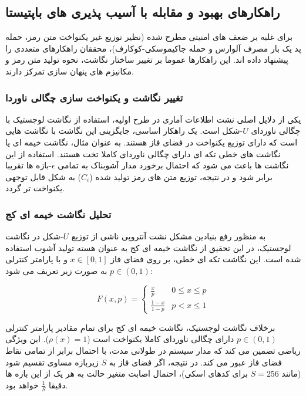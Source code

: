 \documentclass[12pt]{report}
\begin{document}
\subsection{راهکارهای بهبود و مقابله با آسیب پذیری های باپتیستا}
برای غلبه بر ضعف های امنیتی مطرح شده (نظیر توزیع غیر یکنواخت متن رمز، حمله پد یک بار مصرف 
آلوارس و حمله جاکیموسکی-کوکارف)، محققان راهکارهای متعددی را پیشنهاد داده اند. این راهکارها 
عموما بر تغییر ساختار نگاشت، نحوه تولید متن رمز و مکانیزم های پنهان سازی تمرکز دارند.

\subsubsection{تغییر نگاشت و یکنواخت سازی چگالی ناوردا}
یکی از دلایل اصلی نشت اطلاعات آماری در طرح اولیه، استفاده از نگاشت لوجستیک با چگالی ناوردای 
$U$-شکل است. یک راهکار اساسی، جایگزینی این نگاشت با نگاشت هایی است که دارای توزیع یکنواخت 
در فضای فاز هستند. به عنوان مثال، نگاشت خیمه ای یا نگاشت های خطی 
تکه ای دارای چگالی ناوردای کاملا تخت هستند. استفاده 
از این نگاشت ها باعث می شود که احتمال برخورد مدار آشوبناک به تمامی $\epsilon$-بازه ها تقریبا 
برابر شود و در نتیجه، توزیع متن های رمز تولید شده ($C_i$) به شکل قابل توجهی یکنواخت تر گردد.

\subsubsection{تحلیل نگاشت خیمه ای کج}
\label{sec:skew_tent_math}
به منظور رفع بنیادین مشکل نشت آنتروپی ناشی از توزیع $U$-شکل در نگاشت لوجستیک، در این تحقیق 
از نگاشت خیمه ای کج به عنوان هسته تولید آشوب استفاده شده است. 
این نگاشت تکه ای خطی، بر روی فضای فاز $x \in [0, 1]$ و با 
پارامتر کنترلی $p \in (0, 1)$ به صورت زیر تعریف می شود:

\begin{equation}
    F(x, p) = 
    \begin{cases} 
      \frac{x}{p} & 0 \le x \le p \\
      \frac{1 - x}{1 - p} & p < x \le 1 
   \end{cases}
\end{equation}

برخلاف نگاشت لوجستیک، نگاشت خیمه ای کج برای تمام مقادیر پارامتر کنترلی $p \in (0, 1)$ دارای 
چگالی ناوردای کاملا یکنواخت است ($\rho(x) = 1$). این ویژگی ریاضی تضمین می کند که مدار سیستم در 
طولانی مدت، با احتمال برابر از تمامی نقاط فضای فاز عبور می کند. در نتیجه، اگر فضای فاز به $S$ 
زیربازه مساوی تقسیم شود (مانند $S=256$ برای کدهای اسکی)، احتمال اصابت متغیر حالت به هر یک از 
این بازه ها دقیقا $\frac{1}{S}$ خواهد بود. 
\end{document}
